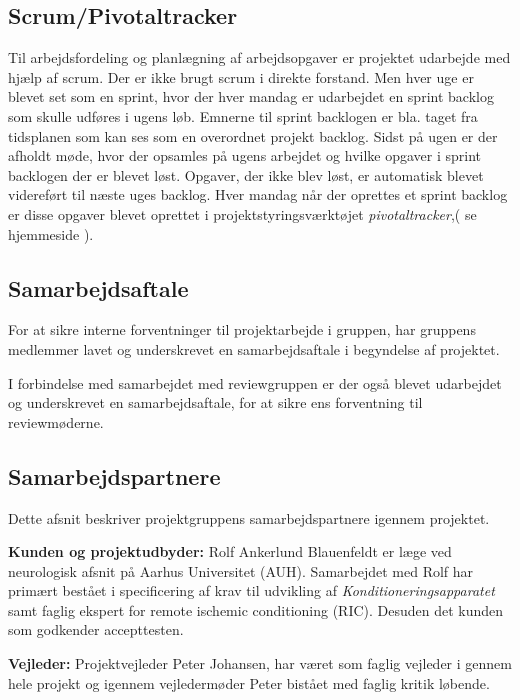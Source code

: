 \subsection{Scrum/Pivotaltracker} \label{title:scrum}
Til arbejdsfordeling og planlægning af arbejdsopgaver er projektet udarbejde med hjælp af scrum. Der er ikke brugt scrum i direkte forstand. Men hver uge er blevet set som en sprint, hvor der hver mandag er udarbejdet en sprint backlog som skulle udføres i ugens løb. Emnerne til sprint backlogen er bla. taget fra tidsplanen som kan ses som en overordnet projekt backlog. Sidst på ugen er der afholdt møde, hvor der opsamles på ugens arbejdet og hvilke opgaver i sprint backlogen der er blevet løst. Opgaver, der ikke blev løst, er automatisk blevet videreført til næste uges backlog. Hver mandag når der oprettes et sprint backlog er disse opgaver blevet oprettet i projektstyringsværktøjet \textit{pivotaltracker},( se hjemmeside ). 

\subsection{Samarbejdsaftale}
For at sikre interne forventninger til projektarbejde i gruppen, har gruppens medlemmer lavet og underskrevet en samarbejdsaftale i begyndelse af projektet. 

I forbindelse med samarbejdet med reviewgruppen er der også blevet udarbejdet og underskrevet en samarbejdsaftale, for at sikre ens forventning til reviewmøderne. 

\subsection{Samarbejdspartnere} \label{title:samarbejdspartnere}
Dette afsnit beskriver projektgruppens samarbejdspartnere igennem projektet. 

\textbf{Kunden og projektudbyder:} Rolf Ankerlund Blauenfeldt er læge ved neurologisk afsnit på Aarhus Universitet (AUH). Samarbejdet med Rolf har primært bestået i specificering af krav til udvikling af \textit{Konditioneringsapparatet} samt faglig ekspert for remote ischemic conditioning (RIC). Desuden det kunden som godkender accepttesten.

\textbf{Vejleder:} Projektvejleder Peter Johansen, har været som faglig vejleder i gennem hele projekt og igennem vejledermøder Peter bistået med faglig kritik løbende. 

